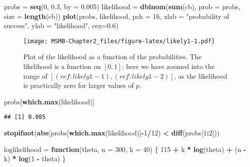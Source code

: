 \documentclass[]{article}
\newenvironment{Shaded}{\begin{snugshade}}{\end{snugshade}}
\newcommand{\KeywordTok}[1]{\textcolor[rgb]{0.13,0.29,0.53}{\textbf{#1}}}
\newcommand{\DataTypeTok}[1]{\textcolor[rgb]{0.13,0.29,0.53}{#1}}
\newcommand{\DecValTok}[1]{\textcolor[rgb]{0.00,0.00,0.81}{#1}}
\newcommand{\FloatTok}[1]{\textcolor[rgb]{0.00,0.00,0.81}{#1}}
\newcommand{\StringTok}[1]{\textcolor[rgb]{0.31,0.60,0.02}{#1}}
\newcommand{\ControlFlowTok}[1]{\textcolor[rgb]{0.13,0.29,0.53}{\textbf{#1}}}
\newcommand{\OperatorTok}[1]{\textcolor[rgb]{0.81,0.36,0.00}{\textbf{#1}}}
\newcommand{\NormalTok}[1]{#1}
\begin{document}
\begin{Shaded}
\begin{Highlighting}[]
\NormalTok{probs  =}\StringTok{  }\KeywordTok{seq}\NormalTok{(}\DecValTok{0}\NormalTok{, }\FloatTok{0.3}\NormalTok{, }\DataTypeTok{by =} \FloatTok{0.005}\NormalTok{)}
\NormalTok{likelihood =}\StringTok{ }\KeywordTok{dbinom}\NormalTok{(}\KeywordTok{sum}\NormalTok{(cb), }\DataTypeTok{prob =}\NormalTok{ probs, }\DataTypeTok{size =} \KeywordTok{length}\NormalTok{(cb))}
\KeywordTok{plot}\NormalTok{(probs, likelihood, }\DataTypeTok{pch =} \DecValTok{16}\NormalTok{, }\DataTypeTok{xlab =} \StringTok{"probability of success"}\NormalTok{,}
     \DataTypeTok{ylab =} \StringTok{"likelihood"}\NormalTok{, }\DataTypeTok{cex=}\FloatTok{0.6}\NormalTok{)}
\end{Highlighting}
\end{Shaded}

\begin{figure}
\centering
\texttt{[image: MSMB-Chapter2\_files/figure-latex/likely1-1.pdf]}
\caption{Plot of the likelihood as a function of the probabilities. The
likelihood is a function on \([0, 1]\); here we have zoomed into the
range of \([(ref:likely1-1), (ref:likely1-2)]\), as the likelihood is
practically zero for larger values of \(p\).}
\end{figure}

\begin{Shaded}
\begin{Highlighting}[]
\NormalTok{probs[}\KeywordTok{which.max}\NormalTok{(likelihood)]}
\end{Highlighting}
\end{Shaded}

\begin{verbatim}
## [1] 0.085
\end{verbatim}

\begin{Shaded}
\begin{Highlighting}[]
\KeywordTok{stopifnot}\NormalTok{(}\KeywordTok{abs}\NormalTok{(probs[}\KeywordTok{which.max}\NormalTok{(likelihood)]}\OperatorTok{-}\DecValTok{1}\OperatorTok{/}\DecValTok{12}\NormalTok{) }\OperatorTok{<}\StringTok{ }\KeywordTok{diff}\NormalTok{(probs[}\DecValTok{1}\OperatorTok{:}\DecValTok{2}\NormalTok{]))}
\end{Highlighting}
\end{Shaded}

\begin{Shaded}
\begin{Highlighting}[]
\NormalTok{loglikelihood =}\StringTok{ }\ControlFlowTok{function}\NormalTok{(theta, }\DataTypeTok{n =} \DecValTok{300}\NormalTok{, }\DataTypeTok{k =} \DecValTok{40}\NormalTok{) \{}
  \DecValTok{115} \OperatorTok{+}\StringTok{ }\NormalTok{k }\OperatorTok{*}\StringTok{ }\KeywordTok{log}\NormalTok{(theta) }\OperatorTok{+}\StringTok{ }\NormalTok{(n }\OperatorTok{-}\StringTok{ }\NormalTok{k) }\OperatorTok{*}\StringTok{ }\KeywordTok{log}\NormalTok{(}\DecValTok{1} \OperatorTok{-}\StringTok{ }\NormalTok{theta)}
\NormalTok{\}}
\end{Highlighting}
\end{Shaded}
\end{document}
